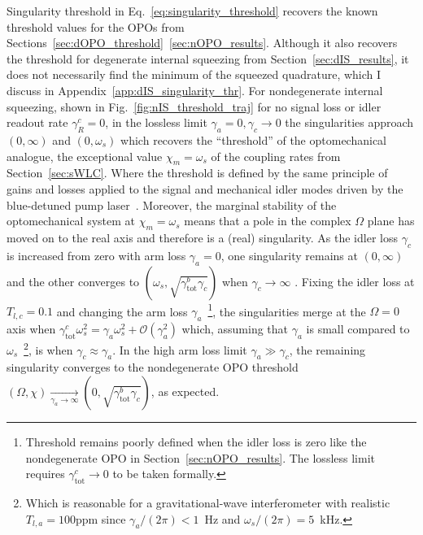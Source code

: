 Singularity threshold in Eq.~\ref{eq:singularity_threshold} recovers the known threshold values for the OPOs from Sections~\ref{sec:dOPO_threshold}~\ref{sec:nOPO_results}. Although it also recovers the threshold for degenerate internal squeezing from Section~\ref{sec:dIS_results}, it does not necessarily find the minimum of the squeezed quadrature, which I discuss in Appendix~\ref{app:dIS_singularity_thr}.
For nondegenerate internal squeezing, shown in Fig.~\ref{fig:nIS_threshold_traj} for no signal loss or idler readout rate $\gamma^c_R=0$, in the lossless limit $\gamma_a=0,\gamma_c\rightarrow0$ the singularities approach $(0,\infty)$ and $(0,\omega_s)$ which recovers the ``threshold'' of the optomechanical analogue, the exceptional value $\chi_m=\omega_s$ of the coupling rates from Section~\ref{sec:sWLC}. Where the threshold is defined by the same principle of gains and losses applied to the signal and mechanical idler modes driven by the blue-detuned pump laser~\cite{}. Moreover, the marginal stability of the optomechanical system at $\chi_m=\omega_s$ means that a pole in the complex $\Omega$ plane has moved on to the real axis and therefore is a (real) singularity. As the idler loss $\gamma_c$ is increased from zero with arm loss $\gamma_a=0$, one singularity remains at $(0,\infty)$ and the other converges to $(\omega_s,\sqrt{\gamma^b_\text{tot}\gamma_c})$ when $\gamma_c\rightarrow\infty$ . Fixing the idler loss at $T_{l,c}=0.1$ and changing the arm loss $\gamma_a$~\footnote{Threshold remains poorly defined when the idler loss is zero  like the nondegenerate OPO in Section~\ref{sec:nOPO_results}. The lossless limit requires $\gamma^c_\text{tot}\rightarrow0$ to be taken formally.}, the singularities merge  at the $\Omega=0$ axis when $\gamma^c_\text{tot}\omega_s^2=\gamma_a\omega_s^2+\mathcal{O}(\gamma_a^2)$ which, assuming that $\gamma_a$ is small compared to $\omega_s$~\footnote{Which is reasonable for a gravitational-wave interferometer with realistic $T_{l,a}=100\text{ppm}$ since $\gamma_a/(2\pi)<1$~Hz and $\omega_s/(2\pi)=5$~kHz.}, is when $\gamma_c\approx\gamma_a$. In the high arm loss limit $\gamma_a\gg\gamma_c$, the remaining singularity converges to the nondegenerate OPO threshold $(\Omega,\chi)\xrightarrow[\gamma_a\rightarrow\infty]{}(0,\sqrt{\gamma^b_\mathrm{tot}\gamma_c})$, as expected.

